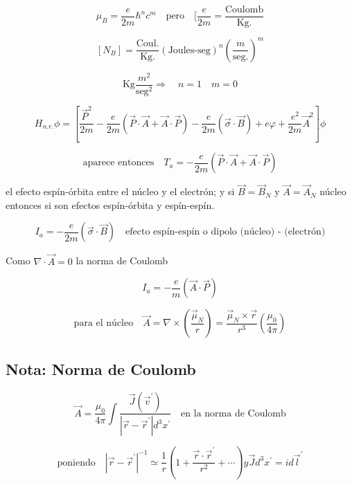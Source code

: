 \documentclass{report}
\begin{document}
\[\mu _{B} = \frac{e}{2m} \hbar ^n c^m \quad \text{pero} \quad [\frac{e}{2m} = \frac{\text{Coulomb}}{\text{Kg.}}\]

\[[N_{B}] = \frac{\text{Coul.}}{\text{Kg.}} (\text{Joules-seg})^n (\frac{m}{\text{seg.}})^m\]

\[\text{Kg} \frac{m^2}{\text{seg}^2} \Rightarrow \quad n = 1 \quad m = 0\]

\[H_{n.r.} \phi = [ \frac{\overrightarrow{P}^2 }{2m} - \frac{e}{2m} (\overrightarrow{P} \cdot \overrightarrow{A} + \overrightarrow{A}\cdot \overrightarrow{P}) - \frac{e}{2m} (\overrightarrow{\sigma} \cdot \overrightarrow{B})+e \varphi + \frac{e^2}{2m} \overrightarrow{A}^2 ] \phi \]

\[\text{aparece entonces} \quad T_a = - \frac{e}{2m} (\overrightarrow{P} \cdot \overrightarrow{A} + \overrightarrow{A}\cdot \overrightarrow{P}) \]

el efecto espín-órbita entre el núcleo y el electrón; y si $\overrightarrow{B} = \overrightarrow{B}_{N}$ y $\overrightarrow{A} = \overrightarrow{A}_{N}$ núcleo entonces si son efectos espín-órbita y espín-espín.

\[I_a = - \frac{e}{2m} (\overrightarrow{\sigma} \cdot \overrightarrow{B}) \quad \text{efecto espín-espín o dipolo (núcleo) - (electrón)}\]

Como $\nabla \cdot \overrightarrow{A} = 0$ la norma de Coulomb

\[I_{a} = - \frac{e}{m} (\overrightarrow{A} \cdot \overrightarrow{P})\]

\[\text{para el núcleo} \quad \overrightarrow{A} = \nabla \times (\frac{\overrightarrow{\mu } _{N}}{r}) = \frac{\overrightarrow{\mu }_N \times \overrightarrow{r}}{r^3 } (\frac{\mu _0 }{4 \pi })\]


\subsection{Nota: Norma de Coulomb}

\[\overrightarrow{A} = \frac{\mu _0 }{4 \pi } \int \frac{\overrightarrow{J}(\overrightarrow{v}^{\prime})}{|\overrightarrow{r}-\overrightarrow{r}^{\prime}| d^3 x ^{\prime}} \quad \text{en la norma de Coulomb}\]

\[\text{poniendo} \quad |\overrightarrow{r}-\overrightarrow{r}^{\prime}| ^{-1} \simeq \frac{1}{r} (1+ \frac{\overrightarrow{r} \cdot \overrightarrow{r}^{\prime}}{r^2 } + \cdots ) y \overrightarrow{J} d^3 x^{\prime } = i d \overrightarrow{l}^{\prime}\]
\end{document}
